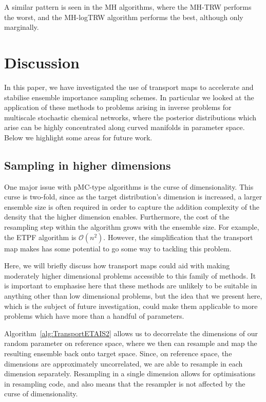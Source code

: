 \documentclass[final]{siamltex}
\begin{document}
A similar pattern is seen in the MH algorithms, where the MH-TRW
performs the worst, and the MH-logTRW algorithm performs the best,
although only marginally. 

\section{Discussion}\label{sec:conc}
In this paper, we have investigated the use of transport maps to
accelerate and stabilise ensemble importance sampling schemes. In
particular we looked at the application of these methods to problems
arising in inverse problems for multiscale stochastic chemical
networks, where the posterior distributions which arise can be highly
concentrated along curved manifolds in parameter space.
Below we highlight some areas for future work.

\subsection{Sampling in higher
  dimensions}\label{sec:TETAIS_higher_dim}

One major issue with pMC-type algorithms is the curse of
dimensionality. This curse is two-fold, since as the target
distribution's dimension is increased, a larger ensemble size is often
required in order to capture the addition complexity of the density
that the higher dimension enables. Furthermore, the cost of the
resampling step within the algorithm grows with the ensemble size. For
example, the ETPF algorithm is $\mathcal{O}(n^2)$. However, the
simplification that the transport map makes has some potential to go
some way to tackling this problem.

Here, we will briefly discuss how transport maps could aid
with making moderately higher dimensional problems accessible to this
family of methods. It is important to emphasise here that these
methods are unlikely to be suitable in anything other than low
dimensional problems, but the idea that we present here, which is the
subject of future investigation, could make them applicable to more
problems which have more than a handful of parameters.

Algorithm~\ref{alg:TransportETAIS2} allows us to decorrelate the
dimensions of our random parameter on reference space, where we then
can resample and map the resulting ensemble back onto target
space. Since, on reference space, the dimensions are approximately uncorrelated, we
are able to resample in each dimension separately. Resampling in a
single dimension allows for optimisations in resampling code, and also
means that the resampler is not affected by the curse of
dimensionality. 
\end{document}
